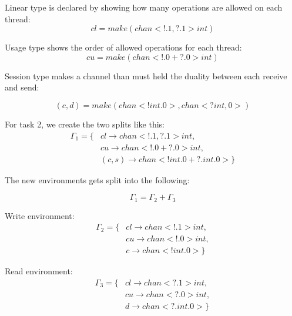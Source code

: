 Linear type is declared by showing how many operations are allowed on each thread:
\[
cl = make(chan<!.1,?.1> int)
\]

Usage type shows the order of allowed operations for each thread:
\[
cu = make(chan<!.0 + ?.0> int)
\]

Session type makes a channel than must held the duality between each receive and send:

\[
(c, d) = make(chan<!int.0>, chan<?int,0>)
\]


For task 2, we create the two splits like this: 
\[
\begin{aligned}
    \Gamma_1 = \{ & cl \rightarrow chan<!.1,?.1> int, \\
                & cu \rightarrow chan<!.0 + ?.0> int, \\
                & (c,s) \rightarrow chan<!int.0 + ?.int.0>\}
\end{aligned}
\]


The new environments gets split into the following: 

\[
\Gamma_1 = \Gamma_2 + \Gamma_3
\]


Write environment:
\[
\begin{aligned}
    \Gamma_2 = \{ & cl \rightarrow chan<!.1> int, \\
                & cu \rightarrow chan<!.0> int, \\
                & c \rightarrow chan<!int.0>\}
\end{aligned}
\]

Read environment: 
\[
\begin{aligned}
    \Gamma_3 = \{ & cl \rightarrow chan<?.1> int, \\
                & cu \rightarrow chan<?.0> int, \\
                & d \rightarrow chan<?.int.0>\}
\end{aligned}
\]

